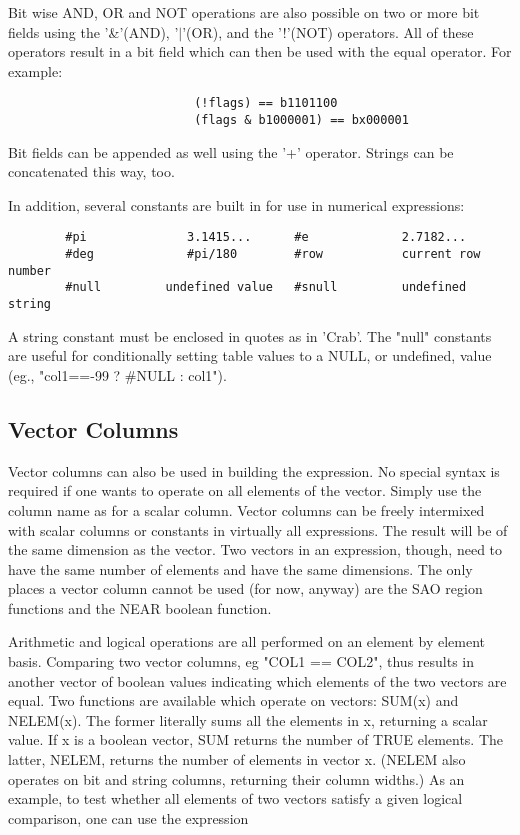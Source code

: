 \documentclass[11pt]{book}
\begin{document}
    Bit wise AND, OR and NOT operations are  also  possible  on  two  or
    more  bit  fields  using  the  '\&'(AND),  '$|$'(OR),  and the '!'(NOT)
    operators. All of these operators result in a bit  field  which  can
    then be used with the equal operator. For example:


\begin{verbatim}
                          (!flags) == b1101100
                          (flags & b1000001) == bx000001
\end{verbatim}

    Bit  fields can be appended as well using the '+' operator.  Strings
    can be concatenated this way, too.

    In addition, several constants are built in  for  use  in  numerical
    expressions:


\begin{verbatim}
        #pi              3.1415...      #e             2.7182...
        #deg             #pi/180        #row           current row number
        #null         undefined value   #snull         undefined string
\end{verbatim}

    A  string constant must  be enclosed  in quotes  as in  'Crab'.  The
    "null" constants  are useful for conditionally  setting table values
    to a NULL, or undefined, value (eg., "col1==-99 ? \#NULL : col1").


\subsection{Vector Columns}

    Vector columns can also be used  in  building  the  expression.   No
    special  syntax  is required if one wants to operate on all elements
    of the vector.  Simply use the column name as for a  scalar  column.
    Vector  columns  can  be  freely  intermixed  with scalar columns or
    constants in virtually all expressions.  The result will be  of  the
    same dimension as the vector.  Two vectors in an expression, though,
    need to  have  the  same  number  of  elements  and  have  the  same
    dimensions.   The  only  places  a vector column cannot be used (for
    now, anyway) are the SAO  region  functions  and  the  NEAR  boolean
    function.

    Arithmetic and logical operations are all performed on an element by
    element basis.  Comparing two vector columns,  eg  "COL1  ==  COL2",
    thus  results  in  another vector of boolean values indicating which
    elements of the two vectors are equal.  Two functions are  available
    which   operate   on  vectors:  SUM(x)  and  NELEM(x).   The  former
    literally sums all the elements in x, returning a scalar value.   If
    x  is  a  boolean  vector,  SUM returns the number of TRUE elements.
    The latter, NELEM, returns the  number  of  elements  in  vector  x.
    (NELEM  also  operates  on  bit  and string columns, returning their
    column widths.)  As an example, to test whether all elements of  two
    vectors  satisfy  a  given  logical  comparison,  one  can  use  the
    expression
\end{document}
